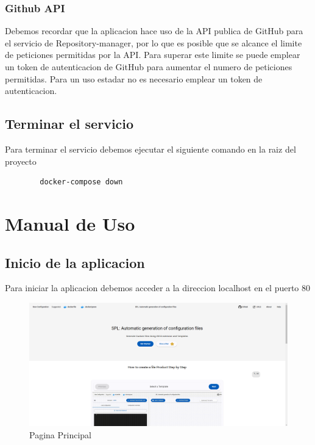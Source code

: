 \documentclass[12pt, a4paper, twoside]{article}
\begin{document}
\begin{umaappendices}
	\subsubsection{Github API}
	Debemos recordar que la aplicacion hace uso de la API publica de GitHub \cite{github_rest_api} para el servicio de Repository-manager, por lo que es posible que se alcance el limite de peticiones permitidas por la API.
	Para superar este limite se puede emplear un token de autenticacion de GitHub \cite{github_tokens} para aumentar el numero de peticiones permitidas.
	Para un uso estadar no es necesario emplear un token de autenticacion.
	\subsection{Terminar el servicio}
	Para terminar el servicio debemos ejecutar el siguiente comando en la raiz del proyecto
	\begin{verbatim}
		docker-compose down
	\end{verbatim}



    \section{Manual de Uso}
	\label{sec:Manual de Uso}
	\subsection{Inicio de la aplicacion}
	Para iniciar la aplicacion debemos acceder a la direccion localhost en el puerto 80
	\begin{figure}[ht]
		\centering
			\includegraphics[width=1\textwidth]{frontpage.png}
		\caption{Pagina Principal}
	\end{figure}

\end{umaappendices}
\end{document}
